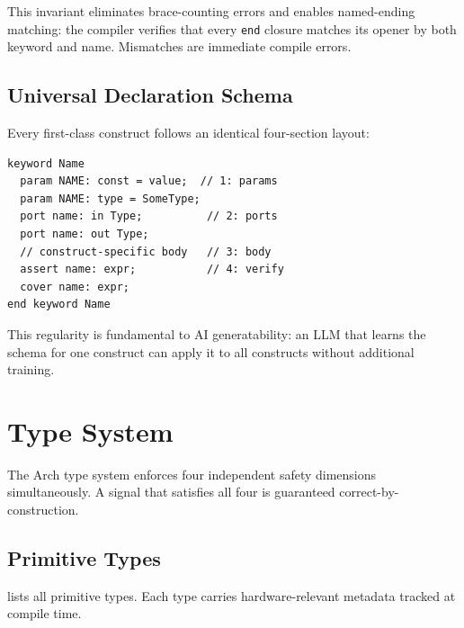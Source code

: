 \documentclass[11pt,twocolumn]{article}
\begin{document}
This invariant eliminates brace-counting errors and enables named-ending matching: the compiler verifies that every \texttt{end} closure matches its opener by both keyword and name. Mismatches are immediate compile errors.

\subsection{Universal Declaration Schema}

Every first-class construct follows an identical four-section layout:

\begin{lstlisting}[language=Arch,caption={Universal schema},label={lst:schema}]
keyword Name
  param NAME: const = value;  // 1: params
  param NAME: type = SomeType;
  port name: in Type;          // 2: ports
  port name: out Type;
  // construct-specific body   // 3: body
  assert name: expr;           // 4: verify
  cover name: expr;
end keyword Name
\end{lstlisting}

This regularity is fundamental to AI generatability: an LLM that learns the schema for one construct can apply it to all constructs without additional training.

\section{Type System}\label{sec:types}

The Arch type system enforces four independent safety dimensions simultaneously. A signal that satisfies all four is guaranteed correct-by-construction.

\subsection{Primitive Types}

 lists all primitive types. Each type carries hardware-relevant metadata tracked at compile time.
\end{document}
